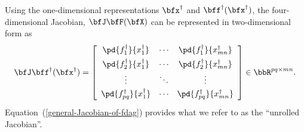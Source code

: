 \documentclass[10pt,pdftex]{article}
\begin{document}
Using the one-dimensional representations $\bfx^{\dag}$ and
$\bff^{\dag}(\bfx^{\dag})$, the four-dimensional Jacobian,
$\bfJ\bfF(\bfX)$ can be represented in two-dimensional form as
\begin{equation}\label{general-Jacobian-of-fdag}
  \bfJ\bff^\dag(\bfx^\dag) =
  \left[
    \begin{array}{ccc}
      \pd{f^\dag_1}{x^\dag_1} & \cdots & \pd{f^\dag_1}{x^\dag_{mn}} \vspace{4pt} \\
      \pd{f^\dag_2}{x^\dag_1} & \cdots & \pd{f^\dag_2}{x^\dag_{mn}} \vspace{2pt} \\
      \vdots & \ddots & \vdots \vspace{2pt} \\
      \pd{f^\dag_{pq}}{x^\dag_1} & \cdots & \pd{f^\dag_{pq}}{x^\dag_{mn}} \vspace{2pt} \\
    \end{array}
  \right]\in\bbR^{pq\times mn}.
\end{equation}
Equation~(\ref{general-Jacobian-of-fdag}) provides what we refer to as the ``unrolled Jacobian''.


\renewcommand{\baselinestretch}{1}
\normalsize
\normalfont


\end{document}
